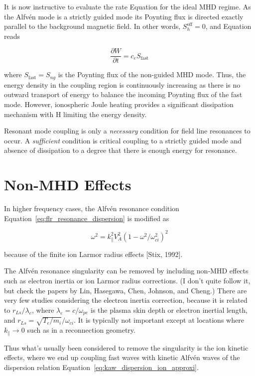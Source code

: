\documentclass[
  notoc %
]{tufte-book}
\begin{document}
It is now instructive to evaluate the rate Equation for the ideal MHD
regime. As the Alfvén mode is a strictly guided mode its Poynting flux
is directed exactly parallel to the background magnetic field. In other
words, \(S_h^{\text{off}}=0\), and Equation reads

\[
\frac{\partial W}{\partial t} = c_e S_{\text{fast}}
\]

where \(S_{\text{fast}} = S_{ng}\) is the Poynting flux of the
non-guided MHD mode. Thus, the energy density in the coupling region is
continuously increasing as there is no outward transport of energy to
balance the incoming Poynting flux of the fast mode. However,
ionospheric Joule heating provides a significant dissipation mechanism
with H limiting the energy density.

Resonant mode coupling is only a \emph{necessary} condition for field
line resonances to occur. A \emph{sufficient} condition is critical
coupling to a strictly guided mode and absence of dissipation to a
degree that there is enough energy for resonance.

\hypertarget{non-mhd-effects}{%
\section{Non-MHD Effects}\label{non-mhd-effects}}

In higher frequency cases, the Alfvén resonance condition
Equation~\ref{eq:flr_resonance_dispersion} is modified as

\[
\omega^2 = k_\parallel^2 V_A^2(1-\omega^2/\omega_{ci}^2)^2
\]

because of the finite ion Larmor radius effects {[}Stix, 1992{]}.

The Alfvén resonance singularity can be removed by including non‐MHD
effects such as electron inertia or ion Larmor radius corrections. (I
don't quite follow it, but check the papers by Lin, Hasegawa, Chen,
Johnson, and Cheng.) There are very few studies considering the electron
inertia correction, because it is related to \(r_{Ls}/\lambda_e\), where
\(\lambda_e = c/\omega_{pe}\) is the plasma skin depth or electron
inertial length, and \(r_{Ls}=\sqrt{T_e/m_i}/\omega_{ci}\). It is
typically not important except at locations where
\(k_\parallel\rightarrow 0\) such as in a reconnection geometry.

Thus what's usually been considered to remove the singularity is the ion
kinetic effects, where we end up coupling fast waves with kinetic Alfvén
waves of the dispersion relation
Equation~\ref{eq:kaw_dispersion_ion_approxi}.
\end{document}
